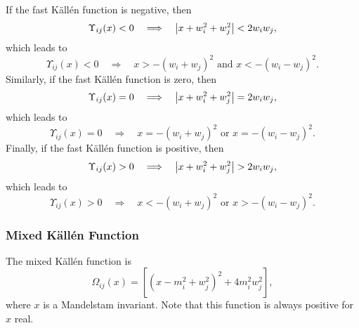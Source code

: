 If the fast K\"{a}ll\'{e}n function is negative, then
\begin{equation}
	\Upsilon_{ij}(x) < 0 \quad \Longrightarrow \quad \left\lvert x + w_{i}^{2} + w_{j}^{2} \right\rvert < 2 w_{i} w_{j},
\end{equation}
which leads to
\begin{equation}
	\Upsilon_{ij}(x) < 0 \quad \Longrightarrow \quad x > -\left(w_{i} + w_{j}\right)^{2} \text{ and } x < -\left(w_{i} - w_{j}\right)^{2}.
\end{equation}
Similarly, if the fast K\"{a}ll\'{e}n function is zero, then
\begin{equation}
	\Upsilon_{ij}(x) = 0 \quad \Longrightarrow \quad \left\lvert x + w_{i}^{2} + w_{j}^{2} \right\rvert = 2 w_{i} w_{j},
\end{equation}
which leads to
\begin{equation}
	\Upsilon_{ij}(x) = 0 \quad \Longrightarrow \quad x = -\left(w_{i} + w_{j}\right)^{2} \text{ or } x = -\left(w_{i} - w_{j}\right)^{2}.
\end{equation}
Finally, if the fast K\"{a}ll\'{e}n function is positive, then
\begin{equation}
	\Upsilon_{ij}(x) > 0 \quad \Longrightarrow \quad \left\lvert x + w_{i}^{2} + w_{j}^{2} \right\rvert > 2 w_{i} w_{j},
\end{equation}
which leads to
\begin{equation}
	\Upsilon_{ij}(x) > 0 \quad \Longrightarrow \quad x < -\left(w_{i} + w_{j}\right)^{2} \text{ or } x > -\left(w_{i} - w_{j}\right)^{2}.
\end{equation}
\subsubsection{Mixed K\"{a}ll\'{e}n Function}
The mixed K\"{a}ll\'{e}n function is
\begin{equation}
	\Omega_{ij}(x) = \left[ \left(x - m_{i}^{2} + w_{j}^{2} \right)^{2} + 4 m_{i}^{2} w_{j}^{2} \right],
\end{equation}
where $x$ is a Mandelstam invariant. Note that this function is always positive for $x$ real.
